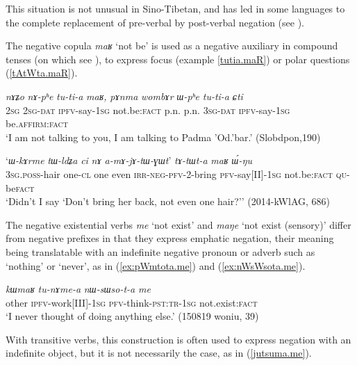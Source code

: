 \documentclass[oneside,a4paper,11pt]{article}
\newcommand{\ipa}[1]{\textit{\phon#1}}
\newcommand{\jpg}[2]{\ipa{#1} `#2'}
\newcommand{\refb}[1]{(\ref{#1})}
\begin{document}
This situation is not unusual in Sino-Tibetan, and has led in some languages to the complete replacement of pre-verbal by post-verbal negation (see \citealt{post15neg}).

The negative copula \jpg{maʁ}{not be} is used as a negative auxiliary in compound tenses (on which see \citealt[268-9]{jacques14linking}), to express focus (example \ref{tutia.maR}) or polar questions (\ref{tAtWta.maR}).
 

\begin{exe}
\ex \label{tutia.maR}
 \gll \ipa{nɤʑo} 	\ipa{nɤ-pʰe} 	\ipa{tu-ti-a} 	\ipa{maʁ,} 	\ipa{pɤnma} 	\ipa{wombɤr} 	\ipa{ɯ-pʰe} 	\ipa{tu-ti-a} 	\ipa{ɕti} \\
 \textsc{2sg} \textsc{2sg-dat} \textsc{ipfv}-say-\textsc{1sg} not.be:\textsc{fact}  p.n. p.n. \textsc{3sg-dat} \textsc{ipfv}-say-\textsc{1sg} be.\textsc{affirm}:\textsc{fact} \\
 \glt `I am not talking to you, I am talking to Padma 'Od.'bar.' (Slobdpon,190)
\end{exe}

\begin{exe}
\ex \label{tAtWta.maR}
 \gll 
`\ipa{ɯ-kɤrme} 	\ipa{tɯ-ldʑa} 	\ipa{ci} 	\ipa{nɤ} 	\ipa{a-mɤ-jɤ-tɯ-ɣɯt}' 	\ipa{tɤ-tɯt-a} 	\ipa{maʁ} 	\ipa{ɯ́-ŋu}  \\
\textsc{3sg.poss}-hair one-\textsc{cl} one even \textsc{irr-neg-pfv}-2-bring \textsc{pfv}-say[II]-\textsc{1sg} not.be:\textsc{fact} \textsc{qu}-be\textsc{fact} \\
\glt `Didn't I say `Don't bring her back, not even one hair?'' (2014-kWlAG, 686)
\end{exe}

The negative existential verbs \jpg{me}{not exist} and \jpg{maŋe}{not exist (sensory)} differ from negative prefixes in that they express emphatic negation, their meaning being translatable with an indefinite negative pronoun or adverb such as `nothing' or `never', as in \refb{ex:pWmtota.me} and \refb{ex:nWsWsota.me}.

\begin{exe}
\ex \label{ex:nWsWsota.me}
\gll  \ipa{kɯmaʁ} 	\ipa{tu-nɤme-a} 	\ipa{nɯ-sɯso-t-a} 	\ipa{me} \\
other \textsc{ipfv}-work[III]-\textsc{1sg} \textsc{pfv}-think-\textsc{pst:tr-1sg} not.exist:\textsc{fact} \\
\glt `I never thought of doing anything else.' (150819 woniu, 39)
\end{exe}  

With transitive verbs, this construction is often used to express negation with an indefinite object, but it is not necessarily the case, as in \refb{jutsuma.me}.
\end{document}
